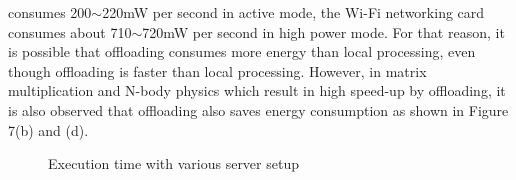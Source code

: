 \documentclass[10pt, conference, compsocconf]{IEEEtran}
\begin{document}
consumes 200$\sim$220mW per second in active mode, the Wi-Fi networking card 
consumes about 710$\sim$720mW per second in high power mode.
%
For that reason, it is possible that offloading consumes more energy than
local processing, even though offloading is faster than local processing. 
%
However, in matrix multiplication and N-body physics which result in high
speed-up by offloading, it is also observed that offloading also
saves energy consumption as shown in Figure 7(b) and (d).
%
\begin{figure}[ht]
\centering
{}
\caption{
Execution time with various server setup}
\end{figure}
\end{document}

